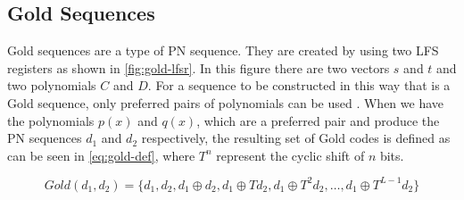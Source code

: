 
\subsection{Gold Sequences}
\label{subsec:gold-sequences}

Gold sequences are a type of PN sequence.  
They are created by using two LFS registers as shown in \autoref{fig:gold-lfsr}.
In this figure there are two vectors $s$ and $t$ and two polynomials $C$ and $D$.
For a sequence to be constructed in this way that is a Gold sequence, only preferred pairs of polynomials can be used \cite{kedia2012comparative}.
When we have the polynomials $p(x)$ and $q(x)$, which are a preferred pair and produce the PN sequences $d_1$ and $d_2$ respectively, the resulting set of Gold codes is defined as can be seen in \autoref{eq:gold-def}, where $T^n$ represent the cyclic shift of $n$ bits.

\begin{equation}
	\label{eq:gold-def}
	Gold(d_1, d_2) = \{ d_1, d_2, d_1 \oplus d_2, d_1 \oplus Td_2, d_1 \oplus T^2d_2, \dotsc, d_1 \oplus T^{L - 1}d_2 \}
\end{equation}


